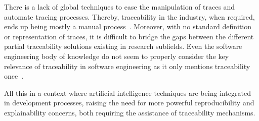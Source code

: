 There is a lack of global techniques to ease the manipulation of traces and automate tracing processes. Thereby, traceability in the industry, when required, ends up being mostly a manual process~\cite{mader2009-motivation-matters-in-traceability-practitioner-survey}.
Moreover, with no standard definition or representation of traces, it is difficult to bridge the gaps between the different partial traceability solutions existing in research subfields\cite{antoniol2017-traceability-grand-challenges,wohlrab2020-traceability-organization-process-culture,winkler2010-survey-traceability-and-MDE}.   %
Even the software engineering body of knowledge do not seem to properly consider the key relevance of traceability in software engineering as it only mentions traceability once~\cite{swebok2014}.

All this in a context where artificial intelligence techniques are being integrated in development processes, raising the need for more powerful reproducibility and explainability concerns, both requiring the assistance of traceability mechanisms. %

